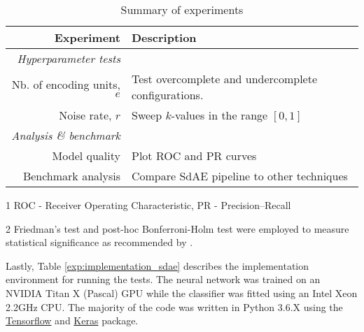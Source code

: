 \begin{table}[h]
  \centering
  \caption{Summary of experiments}
  \label{exp:setup_sdae}
  \begin{threeparttable}
      \begin{tabular}{@{}rp{}@{}}
          \toprule
          Experiment & Description                                                            \\ \midrule
          \textit{Hyperparameter tests}                                                       \\
          Nb. of encoding units, $e$    & Test overcomplete and undercomplete configurations. \\
          Noise rate, $r$               & Sweep $k$-values in the range $\left[0,1\right]$    \\ \cmidrule{1-2} 
          \textit{Analysis \& benchmark}                                                      \\
          Model quality                 & Plot ROC and PR curves\tnote{1}                     \\
          Benchmark analysis            & Compare SdAE pipeline to other techniques\tnote{2}  \\ \bottomrule
      \end{tabular}
      \begin{tablenotes}
        \footnotesize
        \item[1] ROC - Receiver Operating Characteristic, PR - Precision--Recall
        \item[2] Friedman's test \parencite{friedman1937use} and post-hoc
        Bonferroni-Holm test \parencite{holm1979simple} were employed to
        measure statistical significance as recommended by
        \cite{demsar2006statistical}.
      \end{tablenotes}
    \end{threeparttable}
\end{table}

\par Lastly, Table \ref{exp:implementation_sdae} describes the implementation
environment for running the tests. The neural network was trained on an
NVIDIA Titan X (Pascal) GPU while the classifier was fitted using an Intel
Xeon 2.2GHz CPU. The majority of the code was written in Python 3.6.X using
the \href{https://www.tensorflow.org/}{Tensorflow} and
\href{https://keras.io/}{Keras} package. 

